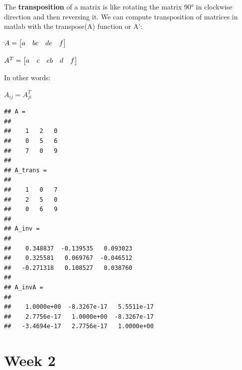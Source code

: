 \documentclass[
]{article}
\newenvironment{Shaded}{\begin{snugshade}}{\end{snugshade}}
\newcommand{\CommentTok}[1]{\textcolor[rgb]{0.56,0.35,0.01}{\textit{#1}}}
\newcommand{\FloatTok}[1]{\textcolor[rgb]{0.00,0.00,0.81}{#1}}
\newcommand{\FunctionTok}[1]{\textcolor[rgb]{0.00,0.00,0.00}{#1}}
\newcommand{\NormalTok}[1]{#1}
\newcommand{\OperatorTok}[1]{\textcolor[rgb]{0.81,0.36,0.00}{\textbf{#1}}}
\begin{document}
The \textbf{transposition} of a matrix is like rotating the matrix 90°
in clockwise direction and then reversing it. We can compute
transposition of matrices in matlab with the transpose(A) function or
A':

\(A = \begin{bmatrix} a & b \newline c & d \newline e & f \end{bmatrix}\)

\(A^T = \begin{bmatrix} a & c & e \newline b & d & f \newline \end{bmatrix}\)

In other words:

\(A_{ij} = A^T_{ji}\)

\begin{Shaded}
\end{Shaded}

\begin{verbatim}
## A =
## 
##    1   2   0
##    0   5   6
##    7   0   9
## 
## A_trans =
## 
##    1   0   7
##    2   5   0
##    0   6   9
## 
## A_inv =
## 
##    0.348837  -0.139535   0.093023
##    0.325581   0.069767  -0.046512
##   -0.271318   0.108527   0.038760
## 
## A_invA =
## 
##    1.0000e+00  -8.3267e-17   5.5511e-17
##    2.7756e-17   1.0000e+00  -8.3267e-17
##   -3.4694e-17   2.7756e-17   1.0000e+00
\end{verbatim}

\hypertarget{week-2}{%
\section{Week 2}\label{week-2}}
\end{document}
